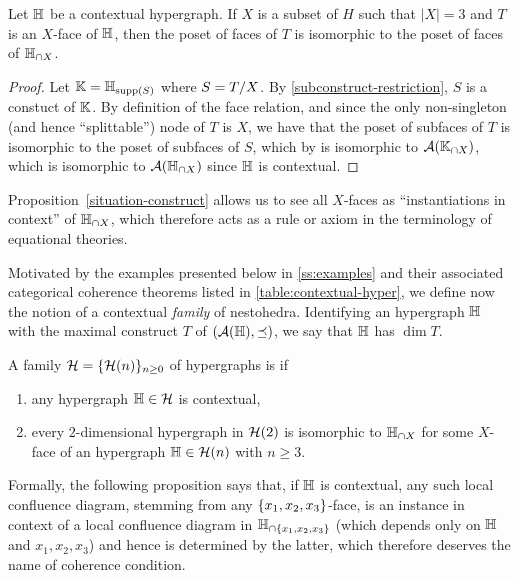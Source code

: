 \begin{proposition} \label{situation-construct}
Let ${\mathbb H}$ be a contextual hypergraph.
If $X$ is a subset of $H$ such that $|X|=3$ and $T$ is an $X$-face of ${\mathbb H}$, then the poset of faces of $T$ is isomorphic to the poset of faces of ${\mathbb H}_{\cap X}$.
\end{proposition}

\begin{proof} 
  Let ${\mathbb K}={\mathbb H}_{\operatorname{supp}(S)}$ where $S=T/X$. 
  By \cref{subconstruct-restriction}, $S$ is a constuct of ${\mathbb K}$. By definition of the face relation, and since the only non-singleton (and hence ``splittable'') node of $T$ is $X$, we have that the poset of subfaces of $T$ is isomorphic to the poset of subfaces of $S$, which by  is isomorphic to ${\cal A}({\mathbb K}_{\cap X})$, which is isomorphic to ${\cal A}({\mathbb H}_{\cap X})$ since ${\mathbb H}$ is contextual.
\end{proof}

Proposition~\ref{situation-construct} allows us to see all $X$-faces as ``instantiations in context'' of ${\mathbb H}_{\cap X}$, which therefore acts  as a rule or axiom in the terminology of equational theories.

Motivated by the examples presented below in \cref{ss:examples} and their associated categorical coherence theorems listed in \cref{table:contextual-hyper}, we define now the notion of a contextual \emph{family} of nestohedra.
Identifying an hypergraph ${\mathbb H}$ with the maximal construct $T$ of $({\cal A}({\mathbb H}),\preceq)$, we say that ${\mathbb H}$ has  $\dim T$.

\begin{definition}
    A family $\mathcal{H}=\{\mathcal{H}(n)\}_{n\geq 0}$ of hypergraphs is  if 
    \begin{enumerate}
      \item any hypergraph ${\mathbb H} \in \mathcal{H}$ is contextual,
      \item every $2$-dimensional hypergraph in $\mathcal{H}(2)$ is isomorphic to ${\mathbb H}_{\cap X}$ for some $X$-face of an hypergraph ${\mathbb H} \in \mathcal{H}(n)$ with $n\geq 3$. 
    \end{enumerate}
\end{definition}

Formally, the following proposition says that, if ${\mathbb H}$ is contextual, any such local confluence diagram, stemming from any $\left\{x_1,x_2,x_3\right\}$-face, is an instance in context of a local confluence diagram in ${\mathbb H}_{\cap \left\{x_1,x_2,x_3\right\}}$ (which depends only on ${\mathbb H}$ and ${x_1,x_2,x_3}$) and hence is determined by the latter, which therefore deserves the name of coherence condition.

